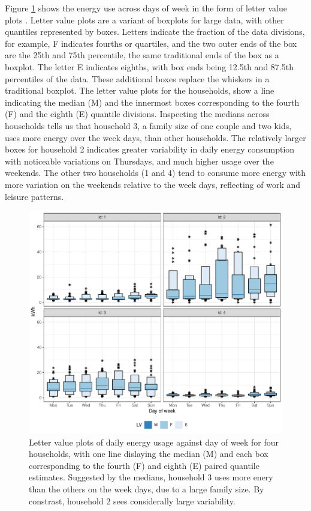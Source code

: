 \documentclass[12pt]{article}
\begin{document}
Figure \ref{fig:dow} shows the energy use across days of week in the form of letter value plots \citep{hofmann2017letter}. Letter value plots are a variant of boxplots for large data, with other quantiles represented by boxes. Letters indicate the fraction of the data divisions, for example, F indicates fourths or quartiles, and the two outer ends of the box are the 25th and 75th percentile, the same traditional ends of the box as a boxplot. The letter E indicates eighths, with box ends being 12.5th and 87.5th percentiles of the data. These additional boxes replace the whiskers in a traditional boxplot. The letter value plots for the households, show a line indicating the median (M) and the innermost boxes corresponding to the fourth (F) and the eighth (E) quantile divisions. Inspecting the medians across households tells us that household 3, a family size of one couple and two kids, uses more energy over the week days, than other households. The relatively larger boxes for household 2 indicates greater variability in daily energy consumption with noticeable variations on Thursdays, and much higher usage over the weekends. The other two households (1 and 4) tend to consume more energy with more variation on the weekends relative to the week days, reflecting of work and leisure patterns.

\begin{figure}

{\centering \includegraphics[width=\textwidth]{figure/dow-1} 

}

\caption{Letter value plots of daily energy usage against day of week for four households, with one line dislaying the median (M) and each box corresponding to the fourth (F) and eighth (E) paired quantile estimates. Suggested by the medians, household 3 uses more enery than the others on the week days, due to a large family size. By constrast, household 2 sees considerally large variability.}\label{fig:dow}
\end{figure}
\end{document}
